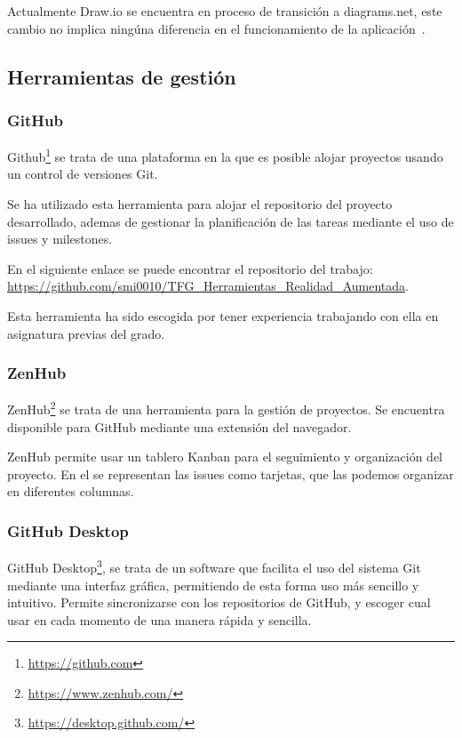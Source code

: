 Actualmente Draw.io se encuentra en proceso de transición a diagrams.net, este cambio no implica ningúna diferencia en el funcionamiento de la aplicación~\cite{diagramsNet}.



\subsection{Herramientas de gestión}

\subsubsection{GitHub}\label{github}
Github\footnote{\url{https://github.com}} se trata de una plataforma en la que es posible alojar proyectos usando un control de versiones Git.

Se ha utilizado esta herramienta para alojar el repositorio del proyecto desarrollado, ademas de gestionar la planificación de las tareas mediante el uso de issues y milestones.

En el siguiente enlace se puede encontrar el repositorio del trabajo: \url{https://github.com/smi0010/TFG_Herramientas_Realidad_Aumentada}.

Esta herramienta ha sido escogida por tener experiencia trabajando con ella en asignatura previas del grado.

\subsubsection{ZenHub}\label{ZenHub}
ZenHub\footnote{\url{https://www.zenhub.com/}} se trata de una herramienta para la gestión de proyectos. Se encuentra disponible para GitHub mediante una extensión del navegador.

ZenHub permite usar un tablero Kanban para el seguimiento y organización del proyecto. En el se representan las issues como tarjetas, que las podemos organizar en diferentes columnas.


\subsubsection{GitHub Desktop}
 GitHub Desktop\footnote{\url{https://desktop.github.com/}}, se trata de un software  que facilita el uso del sistema Git mediante una interfaz gráfica, permitiendo de esta forma uso más sencillo y intuitivo. Permite sincronizarse con los repositorios de GitHub, y escoger cual usar en cada momento de una manera  rápida y sencilla.
 
